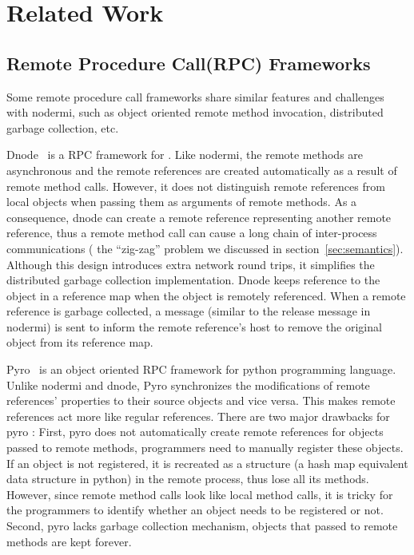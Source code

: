 \chapter{Related Work}

\section{Remote Procedure Call(RPC) Frameworks}
\label{sec:relatedrpc}
Some remote procedure call frameworks share similar features and challenges 
with nodermi, such as object oriented remote method invocation,
distributed garbage collection, etc.

Dnode~\cite{dnode} is a RPC framework for \nodejs{}.  Like nodermi, the remote
methods are asynchronous and the remote references are created automatically
as a result of remote method calls. However, it does not distinguish remote
references from local objects  when passing them as arguments of remote
methods. As a consequence, dnode can create a remote reference representing
another remote reference,  thus  a remote method call can cause a long chain
of inter-process communications ( the ``zig-zag'' problem we discussed in
section~\ref{sec:semantics}). Although this design introduces extra network
round trips, it simplifies the distributed garbage collection implementation.
Dnode keeps reference to the object in a reference map when the object  is
remotely referenced. When a remote reference is garbage collected,  a
 message (similar to the release message in nodermi)  is sent to inform
the remote reference's host   to remove the original object from its reference
map.

 
Pyro~\cite{pyro} is an object oriented RPC framework for python programming
language. Unlike nodermi and dnode, Pyro synchronizes the modifications of
remote references' properties to their source  objects and vice versa. This
makes remote references act more like regular references. There are two major
drawbacks for pyro : First, pyro does not automatically create remote
references for objects passed to remote methods, programmers need to manually
register these objects. If an object is not registered, it is recreated as a
 structure (a hash map equivalent data structure in python) in the
remote process, thus lose all its methods. However, since remote method calls
look like local method calls, it is tricky for the programmers to identify
whether an object needs to be registered or not. Second, pyro lacks garbage
collection mechanism,  objects that passed to remote methods are kept forever.


